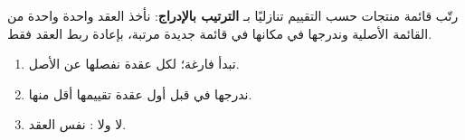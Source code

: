 \begin{statement}
رتّب قائمة منتجات حسب التقييم تنازليًا بـ \textbf{الترتيب بالإدراج}: نأخذ العقد واحدة واحدة من القائمة الأصلية وندرجها في مكانها في قائمة جديدة مرتبة، بإعادة ربط العقد فقط.
\end{statement}
\begin{stepsbox}\begin{enumerate}
\item {} تبدأ فارغة؛ لكل عقدة  نفصلها عن الأصل.
\item ندرجها في  قبل أول عقدة تقييمها أقل منها.
\item لا  ولا : نفس العقد.
\end{enumerate}\end{stepsbox}
